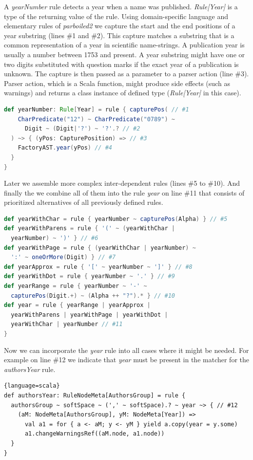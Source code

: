 \documentclass{bmcart}
\begin{document}
A \textit{yearNumber} rule detects a year when a name was published. \textit{Rule[Year]} is a type of the returning value of the rule. Using domain-specific language and elementary rules of \textit{parboiled2} we capture the start and the end positions of a year substring (lines \#1 and \#2). This capture matches a substring that is a common representation of a year in scientific name-strings. A publication year is usually a number between 1753 \cite{Linne1753} and present. A year substring might have one or two digits substituted with question marks if the exact year of a publication is unknown. The capture is then passed as a parameter to a parser action (line \#3). Parser action, which is a Scala function, might produce side effects (such as warnings) and returns a class instance of defined type (\textit{Rule[Year]} in this case).

\begin{lstlisting}[language=scala]
def yearNumber: Rule[Year] = rule { capturePos( // #1
    CharPredicate("12") ~ CharPredicate("0789") ~
      Digit ~ (Digit|'?') ~ '?'.? // #2
  ) ~> { (yPos: CapturePosition) => // #3
    FactoryAST.year(yPos) // #4
  }
}
\end{lstlisting}

Later we assemble more complex inter-dependent rules (lines \#5 to \#10). And finally the we combine all of them into the rule \textit{year} on line \#11 that consists of prioritized alternatives of all previously defined rules.

\begin{lstlisting}[language=scala]
def yearWithChar = rule { yearNumber ~ capturePos(Alpha) } // #5
def yearWithParens = rule { '(' ~ (yearWithChar |
  yearNumber) ~ ')' } // #6
def yearWithPage = rule { (yearWithChar | yearNumber) ~
  ':' ~ oneOrMore(Digit) } // #7
def yearApprox = rule { '[' ~ yearNumber ~ ']' } // #8
def yearWithDot = rule { yearNumber ~ '.' } // #9
def yearRange = rule { yearNumber ~ '-' ~
  capturePos(Digit.+) ~ (Alpha ++ "?").* } // #10
def year = rule { yearRange | yearApprox |
  yearWithParens | yearWithPage | yearWithDot |
  yearWithChar | yearNumber // #11
}
\end{lstlisting}

Now we can incorporate the \textit{year} rule into all cases where it might be needed. For example on line \#12 we indicate that \textit{year} must be present in the matcher for the \textit{authorsYear} rule.

\begin{lstlisting}{language=scala}
def authorsYear: RuleNodeMeta[AuthorsGroup] = rule {
  authorsGroup ~ softSpace ~ (',' ~ softSpace).? ~ year ~> { // #12
    (aM: NodeMeta[AuthorsGroup], yM: NodeMeta[Year]) =>
      val a1 = for { a <- aM; y <- yM } yield a.copy(year = y.some)
      a1.changeWarningsRef((aM.node, a1.node))
  }
}
\end{lstlisting}
\end{document}
